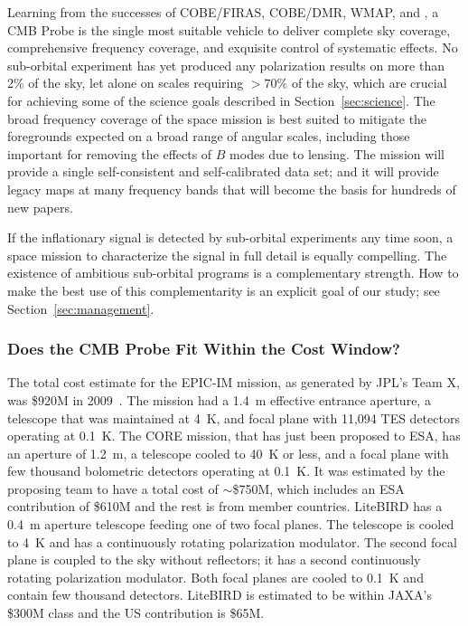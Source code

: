 Learning from the successes of COBE/FIRAS, COBE/DMR, WMAP, and \planck, a
CMB Probe is the single most suitable vehicle to deliver complete sky coverage, 
comprehensive frequency coverage, and exquisite control of systematic effects. 
No sub-orbital experiment 
has yet produced any polarization results on more than 2\% of the sky, let alone 
on scales requiring $>70\%$ of the sky, which are crucial for achieving some
of the science goals described in Section~\ref{sec:science}. 
The broad frequency coverage of the space 
mission is best suited to mitigate the foregrounds expected on a broad range of angular 
scales, including those important for removing the effects of $B$ modes due to lensing. 
The mission will provide a single self-consistent and self-calibrated data set;  and it  
will provide legacy maps at many frequency bands that will become the basis for 
hundreds of new papers. 

If the inflationary signal is detected by sub-orbital experiments
any time soon, a space mission to characterize the signal in full detail is equally compelling. 
The existence of ambitious sub-orbital programs is a complementary strength. How 
to make the best use of this complementarity is an explicit goal of our study; 
see Section~\ref{sec:management}.

\vspace{-0.18in}

\subsubsection{Does the CMB Probe Fit Within the Cost Window?} 

\vspace{-0.05in}

The total cost estimate for the EPIC-IM mission, as generated by JPL's Team X, was \$920M in 2009~\cite{bock2009}. 
The mission had a 1.4~m effective entrance aperture, a telescope that was maintained
at 4~K, and focal plane with 11,094 TES detectors operating at 0.1~K.  The CORE mission, that has just been 
proposed to ESA, has an aperture of 1.2~m, a telescope cooled to 40~K or less, and a focal plane 
with few thousand bolometric detectors operating at 0.1~K. 
It was estimated by the proposing team to have a total cost of $\sim$\$750M, which includes 
an ESA contribution of \$610M and the rest is from member countries.  
LiteBIRD has a 0.4~m aperture telescope feeding one of two focal planes. The telescope 
is cooled to 4~K and has a continuously rotating polarization modulator. 
The second focal plane is coupled to the sky without reflectors; it has a second continuously 
rotating polarization modulator. Both focal planes are cooled to 
0.1~K and contain few thousand detectors. LiteBIRD is estimated to be within JAXA's \$300M class and the 
US contribution is \$65M.  

